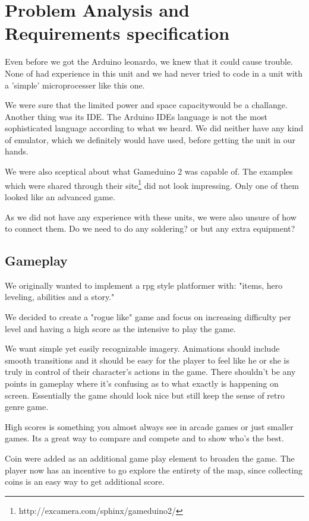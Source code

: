 \chapter{Problem Analysis and Requirements specification}

Even before we got the Arduino leonardo, we knew that it could cause trouble. None of had experience in this unit and
we had never tried to code in a unit with a 'simple'
microprocesser like this one.

We were sure that the limited power and space capacitywould be a challange. Another thing was its IDE. The Arduino IDEs language is not the most
sophisticated language according to what we heard. We did neither have any kind of emulator, which we definitely would have used, before getting the unit in our hands.

We were also sceptical about what Gameduino 2 was capable of. The examples
which were shared through their site\footnote{http://excamera.com/sphinx/gameduino2/} did not look impressing. Only one of them
looked like an advanced game.

As we did not have any experience with these units, we were also unsure of how to connect them. Do we need to do any soldering? or but any extra equipment?

\newpage

\section{Gameplay}%
We originally wanted to implement a rpg style platformer with: "items, hero leveling, abilities and a story."

We decided to create a "rogue like" game and focus on increasing difficulty per level and having a high score as the intensive to play the game.

We want simple yet easily recognizable imagery. Animations should include smooth transitions and it should be easy for the player to feel like he or she is truly in control of their character's actions in the game. There shouldn't be any points in gameplay where it's confusing as to what exactly is happening on screen. Essentially the game should look nice but still keep the sense of retro genre game.

High scores is something you almost always see in arcade games or just smaller games. Its a great way to compare and compete and to show who's the best.

Coin were added as an additional game play element to broaden the game. The player now has an incentive to go explore the entirety of the map, since collecting coins is an easy way to get additional score.
